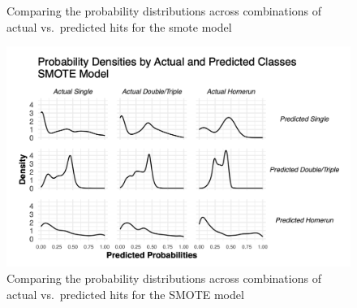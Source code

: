 \documentclass[
  letterpaper,
  DIV=11,
  numbers=noendperiod]{scrartcl}
\begin{document}
\begin{figure}[H]


\caption{\label{fig-pred-den-smote}Comparing the probability
distributions across combinations of actual vs.~predicted hits for the
smote model}

\end{figure}%

\begin{figure}[H]

{\centering \includegraphics{./images/figures/fig14.png}

}

\caption{Comparing the probability distributions across combinations of
actual vs.~predicted hits for the SMOTE model}

\end{figure}%
\end{document}
